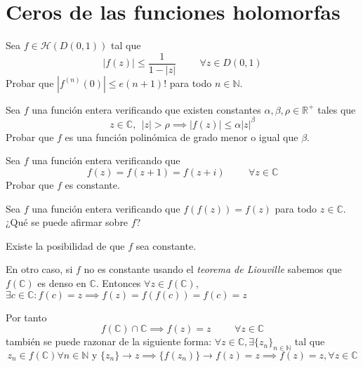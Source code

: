 \newpage


\section{Ceros de las funciones holomorfas}
\begin{ejer}
	Sea $f\in\mathcal{H}(D(0,1))$ tal que
	$$ |f(z)| \leq \frac{1}{1-|z|} \hspace{1cm} \forall z\in D(0,1) $$
	Probar que $|f^{(n)}(0)| \leq e(n+1)!$ para todo $n\in\mathbb{N}$.
\end{ejer}

\begin{ejer}
	Sea $f$ una función entera verificando que existen constantes $\alpha,\beta,\rho\in\mathbb{R}^+$ tales que
	$$ z\in\mathbb{C}, \ \ |z|>\rho \implies |f(z)| \leq \alpha |z|^{\beta} $$
	Probar que $f$ es una función polinómica de grado menor o igual que $\beta$.
\end{ejer}

\begin{ejer}
	Sea $f$ una función entera verificando que
	$$ f(z) = f(z+1)=f(z+i) \hspace{1cm} \forall z\in\mathbb{C} $$
	Probar que $f$ es constante.
\end{ejer}

\begin{ejer}
	Sea $f$ una función entera verificando que $f(f(z))=f(z)$ para todo $z\in\mathbb{C}$. ¿Qué se puede afirmar sobre $f$?
\end{ejer}
\begin{sol}
	Existe la posibilidad de que $f$ sea constante.
	
	En otro caso, si $f$ no es constante usando el \textit{teorema de Liouville} sabemos que $f(\mathbb{C})$ es denso en $\mathbb{C}$.
	Entonces
	$\forall z\in f(\mathbb{C})$, $\exists c\in\mathbb{C} : f(c)=z \implies f(z) = f(f(c)) = f(c) = z$
	
	
	Por tanto
	$$f(\mathbb{C}) \cap \mathbb{C} \implies f(z)=z \hspace{1cm}  \forall z\in \mathbb{C}$$
	también se puede razonar de la siguiente forma:
	$\forall z\in\mathbb{C}, \exists \{z_n\}_{n\in\mathbb{N}}$ tal que 
	$$z_n\in f(\mathbb{C}) \forall n\in\mathbb{N} \text{ y }\{z_n\}\rightarrow z \implies \{f(z_n)\}\rightarrow f(z)=z \implies f(z)=z ,\forall z\in\mathbb{C}$$
\end{sol}

